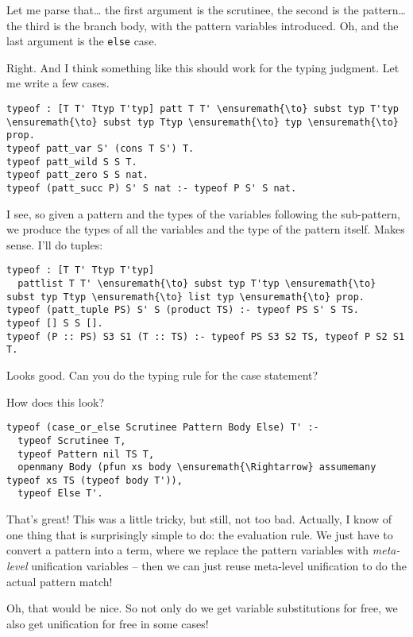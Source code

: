 \heroSTUDENT{} Let me parse that\ldots{} the first argument is the scrutinee,
the second is the pattern\ldots{} the third is the branch body, with the
pattern variables introduced. Oh, and the last argument is the
\texttt{else} case.

\heroADVISOR{} Right. And I think something like this should work for the
typing judgment. Let me write a few cases.

\begin{verbatim}
typeof : [T T' Ttyp T'typ] patt T T' \ensuremath{\to} subst typ T'typ \ensuremath{\to} subst typ Ttyp \ensuremath{\to} typ \ensuremath{\to} prop.
typeof patt_var S' (cons T S') T.
typeof patt_wild S S T.
typeof patt_zero S S nat.
typeof (patt_succ P) S' S nat :- typeof P S' S nat.
\end{verbatim}

\heroSTUDENT{} I see, so given a pattern and the types of the variables
following the sub-pattern, we produce the types of all the variables and
the type of the pattern itself. Makes sense. I'll do tuples:

\begin{verbatim}
typeof : [T T' Ttyp T'typ]
  pattlist T T' \ensuremath{\to} subst typ T'typ \ensuremath{\to} subst typ Ttyp \ensuremath{\to} list typ \ensuremath{\to} prop.
typeof (patt_tuple PS) S' S (product TS) :- typeof PS S' S TS.
typeof [] S S [].
typeof (P :: PS) S3 S1 (T :: TS) :- typeof PS S3 S2 TS, typeof P S2 S1 T.
\end{verbatim}

\heroADVISOR{} Looks good. Can you do the typing rule for the case statement?

\heroSTUDENT{} How does this look?

\begin{verbatim}
typeof (case_or_else Scrutinee Pattern Body Else) T' :-
  typeof Scrutinee T,
  typeof Pattern nil TS T,
  openmany Body (pfun xs body \ensuremath{\Rightarrow} assumemany typeof xs TS (typeof body T')),
  typeof Else T'.
\end{verbatim}

\heroADVISOR{} That's great! This was a little tricky, but still, not too bad.
Actually, I know of one thing that is surprisingly simple to do: the
evaluation rule. We just have to convert a pattern into a term, where we
replace the pattern variables with \emph{meta-level} unification
variables -- then we can just reuse meta-level unification to do the
actual pattern match!

\heroSTUDENT{} Oh, that would be nice. So not only do we get variable
substitutions for free, we also get unification for free in some cases!

